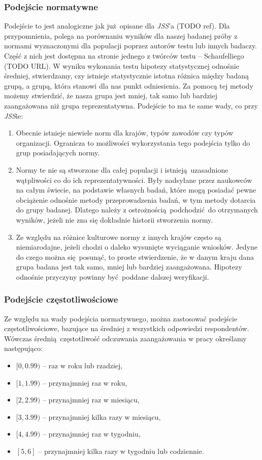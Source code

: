 \subsubsection{Podejście normatywne}
Podejście to jest analogiczne jak już opisane dla \emph{JSS}'a (TODO ref). Dla przypomnienia, polega na porównaniu wyników dla naszej badanej próby z normami wyznaczonymi dla populacji poprzez autorów testu lub innych badaczy. Część z nich jest dostępna na stronie jednego z twórców testu -- Schaufelliego (TODO URL). W wyniku wykonania testu hipotezy statystycznej odnośnie średniej, stwierdzamy, czy istnieje statystycznie istotna różnica między badaną grupą, a grupą, która stanowi
dla nas punkt odniesienia. Za pomocą tej metody możemy stwierdzić, że nasza grupa jest mniej, tak samo lub bardziej zaangażowana niż grupa reprezentatywna. Podejście to ma te same wady, co przy \emph{JSS}ie:
\begin{enumerate}
\item Obecnie istnieje niewiele norm dla krajów, typów zawodów czy typów organizacji. Ogranicza to możliwości wykorzystania tego podejścia tylko do grup posiadających normy.
\item Normy te nie są stworzone dla całej populacji i istnieją uzasadnione wątpliwości co do ich reprezentatywności. Były nadsyłane przez naukowców na całym świecie, na podstawie własnych badań, które mogą posiadać pewne obciążenie odnośnie metody przeprowadzenia badań, w tym metody dotarcia do grupy badanej. Dlatego należy z ostrożnością podchodzić do otrzymanych wyników, jeżeli nie zna się dokładnie historii stworzenia normy.
\item Ze względu na różnice kulturowe normy z innych krajów często są niemiarodajne, jeżeli chodzi o daleko wysunięte wyciąganie wniosków. Jedyne do czego można się posunąć, to proste stwierdzenie, że w danym kraju dana grupa badana jest tak samo, mniej lub bardziej zaangażowana. Hipotezy odnośnie przyczyny powinny być poddane dalszej weryfikacji.
\end{enumerate}

\subsubsection{Podejście częstotliwościowe}
Ze względu na wady podejścia normatywnego, można zastosować podejście częstotliwościowe, bazujące na średniej z wszystkich odpowiedzi respondentów. Wówczas średnią częstotliwość odczuwania zaangażowania w pracy określamy następująco:
\begin{itemize}
\item $[0, 0.99)$ -- raz w roku lub rzadziej,
\item $[1, 1.99)$ -- przynajmniej raz w roku,
\item $[2, 2.99)$ -- przynajmniej raz w miesiącu,
\item $[3, 3.99)$ -- przynajmniej kilka razy w miesiącu,
\item $[4, 4.99)$ -- przynajmniej raz w tygodniu,
\item $[5, 6]$ -- przynajmniej kilka razy w tygodniu lub codziennie. 
\end{itemize}

